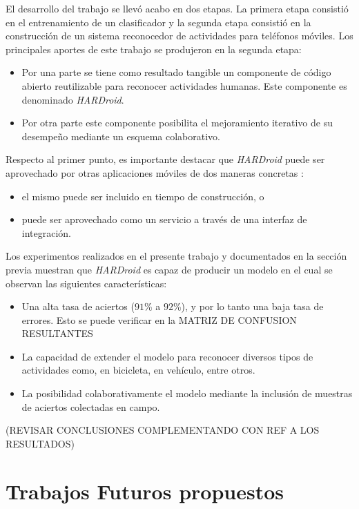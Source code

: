 El desarrollo del trabajo se llevó acabo en dos etapas. La primera
etapa consistió en el entrenamiento de un clasificador y la segunda
etapa consistió en la construcción de un sistema reconocedor de actividades
para teléfonos móviles. Los principales aportes de este trabajo se
produjeron en la segunda etapa:
\begin{itemize}
\item Por una parte se tiene como resultado tangible un componente de código
abierto reutilizable para reconocer actividades humanas. Este componente
es denominado \emph{HARDroid}.
\item Por otra parte este componente posibilita el mejoramiento iterativo
de su desempeño mediante un esquema colaborativo.
\end{itemize}
Respecto al primer punto, es importante destacar que \emph{HARDroid}
puede ser aprovechado por otras aplicaciones móviles de dos maneras
concretas \cite{GimenezYegros2016a}: 
\begin{itemize}
\item el mismo puede ser incluido en tiempo de construcción, o
\item puede ser aprovechado como un servicio a través de una interfaz de
integración.
\end{itemize}
Los experimentos realizados en el presente trabajo y documentados
en la sección previa muestran que \emph{HARDroid} es capaz de producir
un modelo en el cual se observan las siguientes características:
\begin{itemize}
\item Una alta tasa de aciertos ($91$\% a $92$\%), y por lo tanto una
baja tasa de errores. Esto se puede verificar en la MATRIZ DE CONFUSION
RESULTANTES
\item La capacidad de extender el modelo para reconocer diversos tipos de
actividades como, en bicicleta, en vehículo, entre otros.
\item La posibilidad colaborativamente el modelo mediante la inclusión de
muestras de aciertos colectadas en campo.
\end{itemize}
(REVISAR CONCLUSIONES COMPLEMENTANDO CON REF A LOS RESULTADOS)

\section{Trabajos Futuros propuestos}

